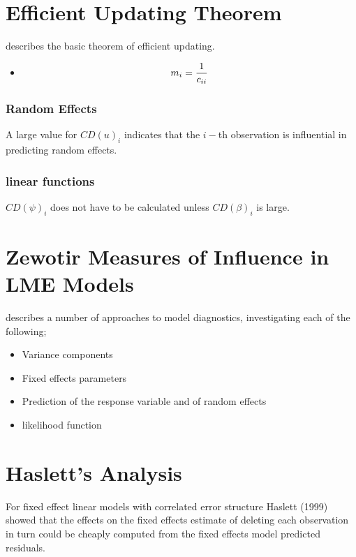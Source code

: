 \documentclass[12pt, a4paper]{article}
\begin{document}
\section{Efficient Updating Theorem} %
\citet{Zewotir} describes the basic theorem of efficient updating.
\begin{itemize}
	\item \[ m_i = {1 \over c_{ii}}\]
\end{itemize}




\subsubsection{Random Effects}


A large value for $CD(u)_i$ indicates that the $i-$th observation is influential in predicting random effects.


\subsubsection{linear functions}


$CD(\psi)_i$ does not have to be calculated unless $CD(\beta)_i$ is large.






\section{Zewotir Measures of Influence in LME Models}%
\citet{Zewotir} describes a number of approaches to model diagnostics, investigating each of the following;
\begin{itemize}
	\item Variance components
	\item Fixed effects parameters
	\item Prediction of the response variable and of random effects
	\item likelihood function
\end{itemize}






\section{Haslett's Analysis} %
For fixed effect linear models with correlated error structure Haslett (1999) showed that the effects on
the fixed effects estimate of deleting each observation in turn could be cheaply computed from the fixed effects model predicted residuals.
\end{document}
